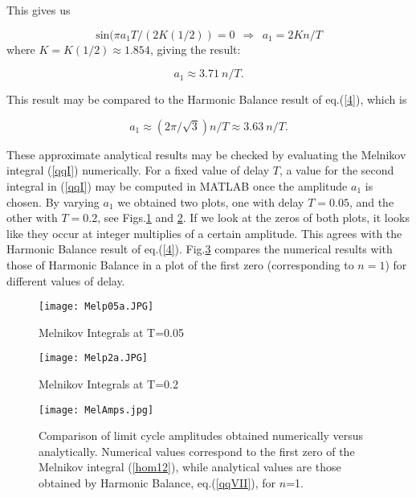 \documentclass[12pt]{article}
\begin{document}
This gives us 

\begin{equation}
\label{qqV} 
\text{sin}(\pi a_1 T/(2K(1/2))=0 ~~\Rightarrow~~ a_1=2Kn/T
\end{equation}
where $K=K(1/2) \approx 1.854$, giving the result:

\begin{equation}
\label{qqVI} 
a_1 \approx 3.71~ n/T.
\end{equation}


This result may be compared to the Harmonic Balance result of eq.(\ref{4}), which is

\begin{equation}
\label{qqVII} 
a_1 \approx (2\pi/\sqrt{3}) n/T \approx 3.63 ~n/T.
\end{equation}

These approximate analytical results may be checked by evaluating the Melnikov integral (\ref{qqI}) numerically.
For a fixed value of delay $T$, a value for the second integral in (\ref{qqI}) may be computed in MATLAB once the amplitude $a_1$ is chosen.
By varying $a_1$ we obtained two plots, one with delay $T=0.05$, and the other with $T=0.2$, see Figs.\ref{fig:M5} and \ref{fig:M2}. 
If we look at the zeros of both plots, it looks like they occur at integer multiplies of a certain amplitude. This agrees with the Harmonic Balance result 
of eq.(\ref{4}).  Fig.\ref{fig:MA} compares the numerical results with those of Harmonic Balance in a plot of the first zero (corresponding to $n=1$) for different values of delay. 

\begin{figure}
	\centering
	\texttt{[image: Melp05a.JPG]}
	\caption{\label{fig:M5} Melnikov Integrals at T=0.05}
\end{figure}

\begin{figure}
	\centering
	\texttt{[image: Melp2a.JPG]}
	\caption{\label{fig:M2} Melnikov Integrals at T=0.2}
\end{figure}

\begin{figure}
	\centering
	\texttt{[image: MelAmps.jpg]}
	\caption{\label{fig:MA} Comparison of limit cycle amplitudes obtained numerically versus analytically.  Numerical values correspond to the first zero of the Melnikov integral (\ref{hom12}), while analytical values are those obtained by Harmonic Balance, eq.(\ref{qqVII}), for $n$=1.}
\end{figure}
\end{document}
